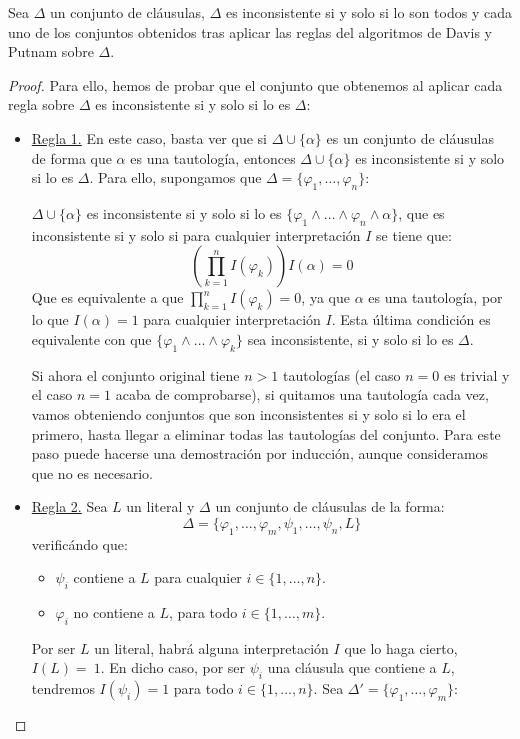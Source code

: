 \begin{teo}\label{teo:func_davis_putnam}
    Sea $\Delta$ un conjunto de cláusulas, $\Delta$ es inconsistente si y solo si lo son todos y cada uno de los conjuntos obtenidos tras aplicar las reglas del algoritmos de Davis y Putnam sobre $\Delta$.
    \begin{proof}
        Para ello, hemos de probar que el conjunto que obtenemos al aplicar cada regla sobre $\Delta$ es inconsistente si y solo si lo es $\Delta$:
        \begin{itemize}
            \item \underline{Regla 1.} En este caso, basta ver que si $\Delta\cup\{\alpha\}$ es un conjunto de cláusulas de forma que $\alpha$ es una tautología, entonces $\Delta\cup\{\alpha\}$ es inconsistente si y solo si lo es $\Delta$. Para ello, supongamos que $\Delta = \{\varphi_1,\ldots,\varphi_n\}$:

                $\Delta\cup\{\alpha\}$ es inconsistente si y solo si lo es $\{\varphi_1\land\ldots\land\varphi_n\land \alpha\}$, que es inconsistente si y solo si para cualquier interpretación $I$ se tiene que:
                \begin{equation*}
                    \left(\prod_{k=1}^{n}I(\varphi_k)\right)I(\alpha) = 0
                \end{equation*}
                Que es equivalente a que $\prod\limits_{k=1}^{n}I(\varphi_k)=0$, ya que $\alpha$ es una tautología, por lo que $I(\alpha)=1$ para cualquier interpretación $I$. Esta última condición es equivalente con que $\{\varphi_1\land\ldots\land\varphi_k\}$ sea inconsistente, si y solo si lo es $\Delta$.

                Si ahora el conjunto original tiene $n>1$ tautologías (el caso $n=0$ es trivial y el caso $n=1$ acaba de comprobarse), si quitamos una tautología cada vez, vamos obteniendo conjuntos que son inconsistentes si y solo si lo era el primero, hasta llegar a eliminar todas las tautologías del conjunto. Para este paso puede hacerse una demostración por inducción, aunque consideramos que no es necesario.
            \item \underline{Regla 2.} Sea $L$ un literal y $\Delta$ un conjunto de cláusulas de la forma: 
                \begin{equation*}
                    \Delta = \{\varphi_1,\ldots,\varphi_m,\psi_1,\ldots,\psi_n,L\}
                \end{equation*}
                verificándo que:
                \begin{itemize}
                    \item $\psi_i$ contiene a $L$ para cualquier $i \in \{1,\ldots,n\}$.
                    \item $\varphi_i$ no contiene a $L$, para todo $i \in \{1,\ldots,m\}$.
                \end{itemize}
                Por ser $L$ un literal, habrá alguna interpretación $I$ que lo haga cierto, $I(L)=~1$. En dicho caso, por ser $\psi_i$ una cláusula que contiene a $L$, tendremos $I(\psi_i)=1$ para todo $i \in \{1,\ldots,n\}$. Sea $\Delta' = \{\varphi_1,\ldots,\varphi_m\}$:


\end{itemize}
\end{proof}
\end{teo}
